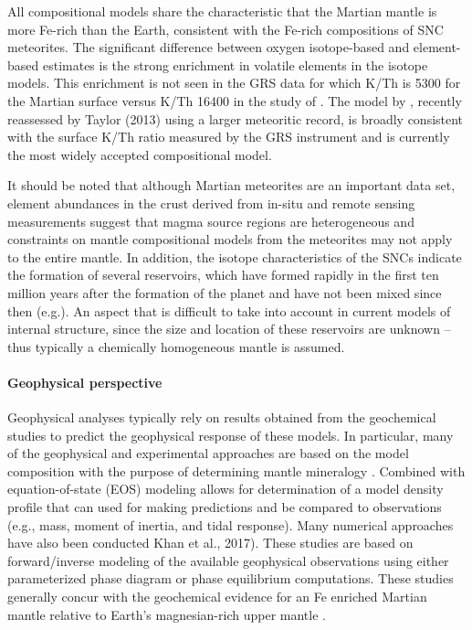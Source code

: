 All compositional models share the characteristic that the Martian mantle is more Fe-rich than the Earth, consistent with the Fe-rich compositions of SNC meteorites.  The significant difference between oxygen isotope-based and element-based estimates is the strong enrichment in volatile elements in the isotope models. This enrichment is not seen in the GRS data \citep{Taylor2007} for which K/Th is 5300 for the Martian surface versus K/Th 16400 in the study of \citep{Lodders1997}. The model by \citep{Wanke1994}, recently reassessed by Taylor (2013) using a larger meteoritic record, is broadly consistent with the surface K/Th ratio measured by the GRS instrument \citep{Taylor2007BulkMars} and is currently the most widely accepted compositional model.  

It should be noted that although Martian meteorites are an important data set, element abundances in the crust derived from in-situ and remote sensing measurements suggest that magma source regions are heterogeneous and constraints on mantle compositional models from the meteorites may not apply to the entire mantle. In addition, the isotope characteristics of the SNCs indicate the formation of several reservoirs, which have formed rapidly in the first ten million years after the formation of the planet and have not been mixed since then (e.g.\cite{Mezger2013}). An aspect that is difficult to take into account in current models of internal structure, since the size and location of these reservoirs are unknown – thus typically a chemically homogeneous mantle is assumed.

\setcounter{tocdepth}{4} \setcounter{secnumdepth}{4}
\paragraph{Geophysical perspective}

Geophysical analyses typically rely on results obtained from the geochemical studies to predict the geophysical response of these models. In particular, many of the geophysical and experimental approaches are based on the \cite{Dreibus1984}  model composition with the purpose of determining mantle mineralogy \citep{Bertka1997, Bertka1998}. Combined with equation-of-state (EOS) modeling allows for determination of a model density profile that can used for making predictions and be compared to observations (e.g., mass, moment of inertia, and tidal response). Many numerical approaches have also been conducted \citep{Longhi1992,Kuskov,Mocquet1996,Sohl1997, Sohl2005,Verhoeven2005,Zharkov2005,Khan2008,Rivoldini2011,Wang2013} Khan et al., 2017).
These studies are based on forward/inverse modeling of the available geophysical observations using either parameterized phase diagram or phase equilibrium computations. These studies generally concur with the geochemical evidence for an Fe enriched Martian mantle relative to Earth’s magnesian-rich upper mantle \cite{McDonough1995}. 

